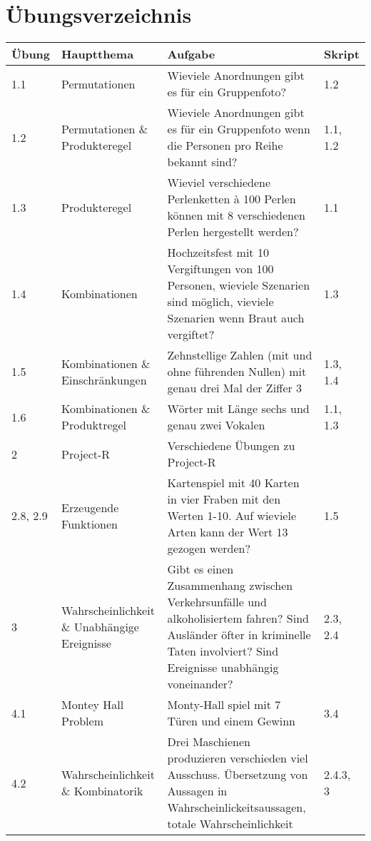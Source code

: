 \section{Übungsverzeichnis}
\begin{center}
\begin{tabular}{|p{1.4cm}|p{5cm}|p{9cm}|p{1.8cm}|}
\hline
\textbf{Übung} & \textbf{Hauptthema} & \textbf{Aufgabe} & \textbf{Skript} \\
\hline
1.1 & Permutationen & Wieviele Anordnungen gibt es für ein Gruppenfoto? & 1.2 \\
\hline
1.2 & Permutationen \& Produkteregel & Wieviele Anordnungen gibt es für ein
Gruppenfoto wenn die Personen pro Reihe bekannt sind?	& 1.1, 1.2 \\
\hline
1.3 & Produkteregel & Wieviel verschiedene Perlenketten à 100 Perlen können mit
8 verschiedenen Perlen hergestellt werden? & 1.1 \\
\hline
1.4 & Kombinationen & Hochzeitsfest mit 10 Vergiftungen von 100 Personen,
wieviele Szenarien sind möglich, vieviele Szenarien wenn Braut auch vergiftet? &
1.3 \\
\hline
1.5 & Kombinationen \& \newline Einschränkungen & Zehnstellige Zahlen (mit und
ohne führenden Nullen) mit genau drei Mal der Ziffer 3 & 1.3, 1.4 \\
\hline
1.6 & Kombinationen \& Produktregel & Wörter mit Länge sechs und genau zwei
Vokalen & 1.1, 1.3 \\
\hline
2 & Project-R & Verschiedene Übungen zu Project-R & \\
\hline
2.8, 2.9 & Erzeugende Funktionen & Kartenspiel mit 40 Karten in vier Fraben
mit den Werten 1-10. Auf wieviele Arten kann der Wert 13 gezogen werden? & 1.5 \\
\hline
3 & Wahrscheinlichkeit \& \newline Unabhängige Ereignisse &  Gibt
es einen Zusammenhang zwischen Verkehrsunfälle und alkoholisiertem fahren? Sind
Ausländer öfter in kriminelle Taten involviert? Sind Ereignisse unabhängig
voneinander? & 2.3, 2.4 \\
\hline
4.1 & Montey Hall Problem & Monty-Hall spiel mit 7 Türen und einem Gewinn & 3.4
\\
\hline
4.2 & Wahrscheinlichkeit \& \newline Kombinatorik & Drei Maschienen produzieren
verschieden viel Ausschuss. Übersetzung von Aussagen in
Wahrscheinlickeitsaussagen, totale Wahrscheinlichkeit & 2.4.3, 3 \\

\end{tabular}
\end{center}
